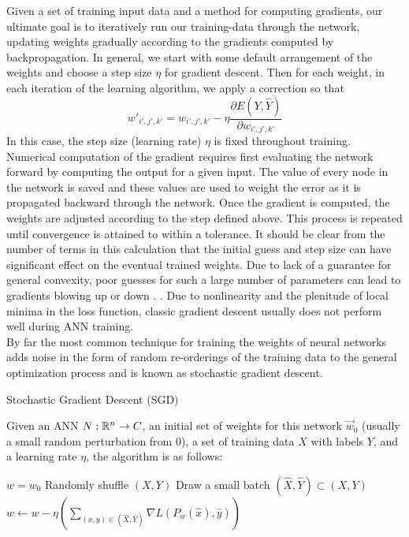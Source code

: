 Given a set of training input data and a method for computing gradients, our ultimate goal is to iteratively run our training-data through the network, updating weights gradually according to the gradients computed by backpropagation. In general, we start with some
default arrangement of the weights and choose a step
size $\eta$ for gradient descent. Then for each weight, in each iteration
of the learning algorithm, we apply a correction so that 
\[w'_{i',j',k'} = w_{i',j',k'}-\eta \frac{\partial E(Y,\hat Y)}{\partial
    w_{i',j',k'}}\]
    In this case, the step size (learning rate) $\eta$ is fixed throughout training.
    Numerical computation of the gradient requires first evaluating the network forward by computing the output for a given input. The value of every node in the network is saved and these values are used to weight the error as it is propagated backward through the network. Once the gradient is computed, the weights are adjusted according to the step defined above. This process is repeated until convergence is attained to within a tolerance. It should be
clear from the number of terms in this calculation that the initial
guess and step size can have significant effect on the eventual trained weights.
Due to lack of a guarantee for general convexity, poor guesses for such a large number of parameters can lead
to gradients blowing up or down   \cite{Bishop:2006:PRM:1162264}. 
. Due to nonlinearity and the plenitude of local minima in the loss function, classic gradient descent usually does not perform well during ANN training. \\ 
By far the most common technique for training the weights of neural networks adds noise in the form of random re-orderings of the training data to the general optimization process and is known as stochastic gradient descent. 
\begin{definition}{Stochastic Gradient Descent (SGD)}

Given an ANN $N: \mathbb{R}^n \to C$, an initial set of weights for this network $\vec w_0$ (usually a small random perturbation from 0), a set of training data $X$ with labels $Y$, and a learning rate $\eta$, the algorithm is as follows: 

\begin{algorithm}
\caption*{Batch Stochastic Gradient Descent}\label{sgd}
\begin{algorithmic}[H]
\State $w = w_0$
 
\State Randomly shuffle $(X,Y)$
\State Draw a small batch $(\hat X, \hat Y) \subset (X, Y)$
\State $w \leftarrow w - \eta \left(\sum_{(x,y) \in (\hat X, \hat Y)}  \nabla L(P_w(\hat x), \hat y)\right)$
\EndWhile
\end{algorithmic}
\end{algorithm}
\end{definition}
